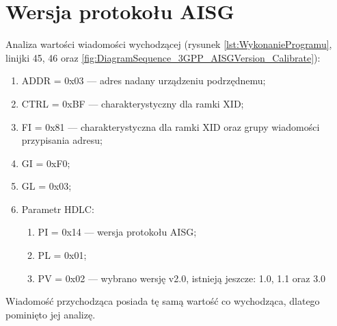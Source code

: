 
\section{Wersja protokołu AISG}
Analiza wartości wiadomości wychodzącej 
(rysunek \ref{lst:WykonanieProgramu}, linijki {45, 46} oraz \ref{fig:DiagramSequence_3GPP_AISGVersion_Calibrate}):
\begin{enumerate}
    \item ADDR = 0x03 --- adres nadany urządzeniu podrzędnemu;
    \item CTRL = 0xBF --- charakterystyczny dla ramki XID;
    \item FI = 0x81 --- charakterystyczna dla ramki XID oraz grupy wiadomości przypisania adresu;
    \item GI = 0xF0;
    \item GL = 0x03;
    \item Parametr HDLC:
    \begin{enumerate}
        \item PI = 0x14 --- wersja protokołu AISG;
        \item PL = 0x01;
        \item PV = 0x02 --- wybrano wersję v2.0, istnieją jeszcze: 1.0, 1.1 oraz 3.0
    \end{enumerate}
\end{enumerate}
Wiadomość przychodząca posiada tę samą wartość co wychodząca, dlatego pominięto jej analizę.
